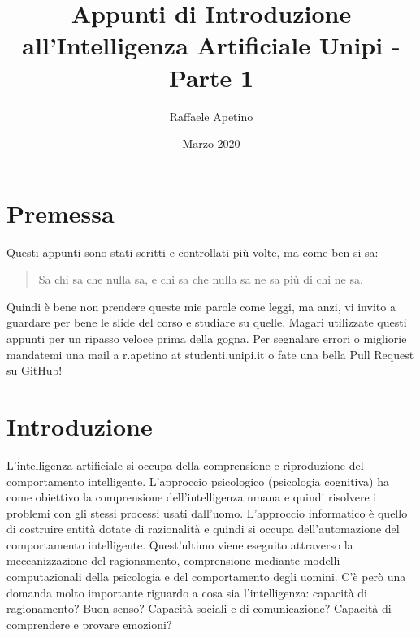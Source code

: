 \documentclass{article}
\title{Appunti di Introduzione all'Intelligenza Artificiale Unipi - Parte 1}
\author{Raffaele Apetino}
\date{Marzo 2020}
\begin{document}
\maketitle

\tableofcontents{}
\clearpage
\section{Premessa}
Questi appunti sono stati scritti e controllati più volte, ma come ben si sa:
\begin{quote}
    Sa chi sa che nulla sa, e chi sa che nulla sa ne sa più di chi ne sa.
\end{quote}
Quindi è bene non prendere queste mie parole come leggi, ma anzi, vi invito a guardare per bene le slide del corso e studiare su quelle. Magari utilizzate questi appunti per un ripasso veloce prima della gogna. Per segnalare errori o migliorie mandatemi una mail a r.apetino at studenti.unipi.it o fate una bella Pull Request su GitHub!

\section{Introduzione}
L'intelligenza artificiale si occupa della comprensione e riproduzione del comportamento intelligente. L'approccio psicologico (psicologia cognitiva) ha come obiettivo la comprensione dell'intelligenza umana e quindi risolvere i problemi con gli stessi processi usati dall'uomo. L'approccio informatico è quello di costruire entità dotate di razionalità e quindi si occupa dell'automazione del comportamento intelligente. Quest'ultimo viene eseguito attraverso la meccanizzazione del ragionamento, comprensione mediante modelli computazionali della psicologia e del comportamento degli uomini. \newline 
C'è però una domanda molto importante riguardo a cosa sia l'intelligenza: capacità di ragionamento? Buon senso? Capacità sociali e di comunicazione? Capacità di comprendere e provare emozioni?
\end{document}
